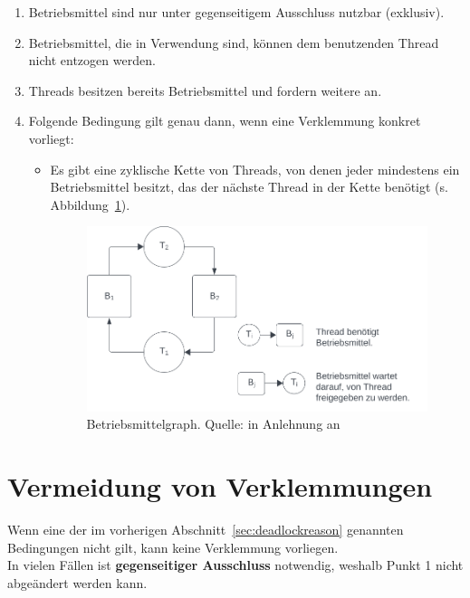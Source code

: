 \begin{enumerate}
    \item Betriebsmittel sind nur unter gegenseitigem Ausschluss nutzbar (exklusiv).
    \item Betriebsmittel, die in Verwendung sind, können dem benutzenden Thread nicht entzogen werden.
    \item Threads besitzen bereits Betriebsmittel und fordern weitere an.
    \item Folgende Bedingung gilt genau dann, wenn eine Verklemmung konkret vorliegt:
    \begin{itemize}
        \item Es gibt eine zyklische Kette von Threads, von denen jeder mindestens ein Betriebsmittel besitzt, das der nächste Thread in der Kette benötigt (s. Abbildung~\ref{fig:cyclic}).
         \begin{figure}
            \centering
            \includegraphics[scale=0.25]{chapters/3/img/cyclic}
            \caption{Betriebsmittelgraph. Quelle: in Anlehnung an \cite[192, Bild 3.9]{Oec22}}
            \label{fig:cyclic}
        \end{figure}
    \end{itemize}
\end{enumerate}


\section{Vermeidung von Verklemmungen}

Wenn eine der im vorherigen Abschnitt~\ref{sec:deadlockreason} genannten Bedingungen nicht gilt, kann keine Verklemmung vorliegen.\\

\noindent
In vielen Fällen ist \textbf{gegenseitiger Ausschluss} notwendig, weshalb Punkt 1 nicht abgeändert werden kann.\\


